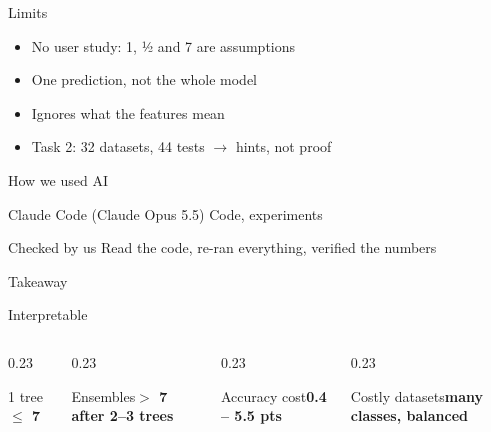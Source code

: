 \documentclass[aspectratio=169,11pt]{beamer}
\begin{document}
\begin{frame}{Limits}
  \Large
  \begin{itemize}\setlength\itemsep{14pt}
    \item No user study: 1, ½ and 7 are assumptions
    \item One prediction, not the whole model
    \item Ignores what the features mean
    \item Task 2: 32 datasets, 44 tests $\rightarrow$ hints, not proof
  \end{itemize}
\end{frame}

\begin{frame}{How we used AI}
  \Large
  \begin{block}{Claude Code (Claude Opus 5.5)}
    Code, experiments
  \end{block}
  \vspace{0.5cm}
  \begin{alertblock}{Checked by us}
    Read the code, re-ran everything, verified the numbers
  \end{alertblock}
\end{frame}

\begin{frame}{Takeaway}
  \begin{block}{Interpretable}
    \centering\vspace{4pt}{\LARGE\bfseries a prediction can be traced in $\le$ 7 steps}\vspace{4pt}
  \end{block}
  \vspace{0.5cm}
  \begin{columns}[t]
    \begin{column}{0.23\textwidth}\begin{block}{1 tree}\centering\large\bfseries $\le$ 7 \checkmark\end{block}\end{column}
    \begin{column}{0.23\textwidth}\begin{alertblock}{Ensembles}\centering\large\bfseries $>$ 7 after 2--3 trees\end{alertblock}\end{column}
    \begin{column}{0.23\textwidth}\begin{block}{Accuracy cost}\centering\large\bfseries 0.4 -- 5.5 pts\end{block}\end{column}
    \begin{column}{0.23\textwidth}\begin{block}{Costly datasets}\centering\large\bfseries many classes, balanced\end{block}\end{column}
  \end{columns}
\end{frame}
\end{document}
